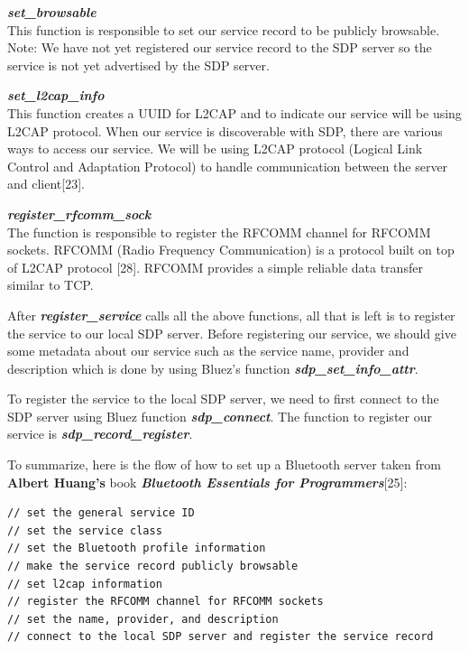 \documentclass[letterpaper,twocolumn,10pt]{article}
\begin{document}
{\hrulefill

\textbf{\emph{set\_browsable}}\\
This function is responsible to set our service record to be publicly browsable. Note: We have not yet registered our service record to the SDP server so the service is not yet advertised by the SDP server.

\hrulefill

\textbf{\emph{set\_l2cap\_info}}\\
This function creates a UUID for L2CAP and to indicate our service will be using L2CAP protocol. When our service is discoverable with SDP, there are various ways to access our service. We will be using L2CAP protocol (Logical Link Control and Adaptation Protocol) to handle communication between the server and client[23].

\hrulefill

\textbf{\emph{register\_rfcomm\_sock}}\\
The function is responsible to register the RFCOMM channel for RFCOMM sockets. RFCOMM (Radio Frequency Communication) is a protocol built on top of L2CAP protocol [28]. RFCOMM provides a simple reliable data transfer similar to TCP.

\hrulefill

After \textbf{\emph{register\_service}} calls all the above functions, all that is left is to register the service to our local SDP server. Before registering our service, we should give some metadata about our service such as the service name, provider and description which is done by using Bluez's function \textbf{\emph{sdp\_set\_info\_attr}}.

To register the service to the local SDP server, we need to first connect to the SDP server using Bluez function \textbf{\emph{sdp\_connect}}. The function to register our service is \textbf{\emph{sdp\_record\_register}}.

To summarize, here is the flow of how to set up a Bluetooth server taken from \textbf{Albert Huang's} book \textbf{\emph{Bluetooth Essentials for Programmers}}[25]:
{\small
\begin{lstlisting}// set the general service ID
// set the service class
// set the Bluetooth profile information
// make the service record publicly browsable
// set l2cap information
// register the RFCOMM channel for RFCOMM sockets
// set the name, provider, and description
// connect to the local SDP server and register the service record
\end{lstlisting}

}}
\end{document}
